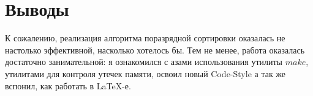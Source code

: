 \section{Выводы}

К сожалению, реализация алгоритма поразрядной сортировки оказалась не настолько эффективной, насколько хотелось бы. Тем не менее, работа оказалась достаточно занимательной: я ознакомился с азами использования утилиты $make$, утилитами для контроля утечек памяти, освоил новый Code-Style а так же вспонил, как работать в LaTeX-е.

\pagebreak
